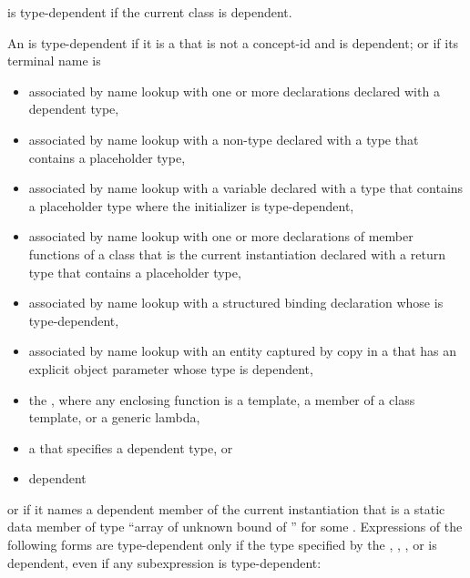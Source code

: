 \pnum
{}
is type-dependent if the current class is
dependent.

\pnum
An  is type-dependent
if it is a  that is not a concept-id and is dependent;
or if its terminal name is
\begin{itemize}
\item
associated by name lookup with one or more declarations
declared with a dependent type,
\item
associated by name lookup with
a non-type 
declared with a type
that contains a placeholder type,
\item
associated by name lookup with
a variable declared with a type that contains a placeholder type
where the initializer is type-dependent,
\item
associated by name lookup with one or more
declarations of member functions of a class that is the current instantiation
declared with a return type that contains a placeholder type,
\item
associated by name lookup with
a structured binding declaration whose
 is type-dependent,
\item
associated by name lookup with
an entity captured by copy
in a 
that has an explicit object parameter whose type is dependent,
\item
the
, where any enclosing function is a
template, a member of a class template, or a generic lambda,
\item
a  that specifies a dependent type, or
\item
dependent
\end{itemize}
or if it names a dependent member of the current instantiation that is a static
data member of type
``array of unknown bound of '' for some .
Expressions of the following forms are type-dependent only if the type
specified by the
,
,
,
or
is dependent, even if any subexpression is type-dependent:

